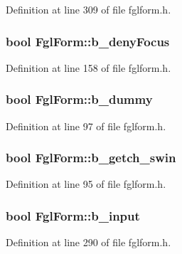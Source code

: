 Definition at line 309 of file fglform.h.

\hypertarget{classFglForm_a99b822401e45535d412f2a6c5601734d}{
\subsubsection[{b\_\-denyFocus}]{\setlength{\rightskip}{0pt plus 5cm}bool {\bf FglForm::b\_\-denyFocus}}}
\label{classFglForm_a99b822401e45535d412f2a6c5601734d}


Definition at line 158 of file fglform.h.

\hypertarget{classFglForm_a4dd283ca13e8a699e88783b2946b6841}{
\subsubsection[{b\_\-dummy}]{\setlength{\rightskip}{0pt plus 5cm}bool {\bf FglForm::b\_\-dummy}}}
\label{classFglForm_a4dd283ca13e8a699e88783b2946b6841}


Definition at line 97 of file fglform.h.

\hypertarget{classFglForm_ac6325d19f253fe4e7cdfbd50bd027c19}{
\subsubsection[{b\_\-getch\_\-swin}]{\setlength{\rightskip}{0pt plus 5cm}bool {\bf FglForm::b\_\-getch\_\-swin}}}
\label{classFglForm_ac6325d19f253fe4e7cdfbd50bd027c19}


Definition at line 95 of file fglform.h.

\hypertarget{classFglForm_a348ba4d61a2c9e18513ac88c919015c0}{
\subsubsection[{b\_\-input}]{\setlength{\rightskip}{0pt plus 5cm}bool {\bf FglForm::b\_\-input}}}
\label{classFglForm_a348ba4d61a2c9e18513ac88c919015c0}


Definition at line 290 of file fglform.h.

